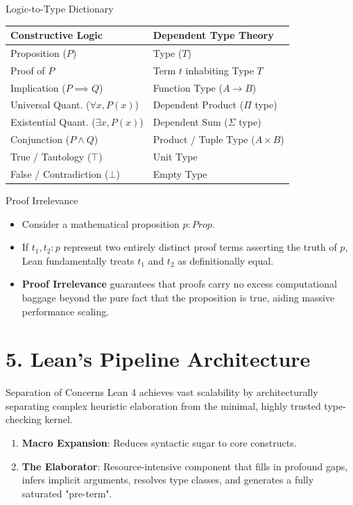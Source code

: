 \documentclass[12pt, aspectratio=169]{beamer}
\begin{document}
\begin{frame}{Logic-to-Type Dictionary}
\begin{table}[]
\begin{tabular}{ll}
\textbf{Constructive Logic}          & \textbf{Dependent Type Theory} \\ \hline
Proposition ($P$)                    & Type ($T$)                     \\
Proof of $P$                         & Term $t$ inhabiting Type $T$   \\
Implication ($P \implies Q$)         & Function Type ($A \to B$)      \\
Universal Quant. ($\forall x, P(x)$) & Dependent Product ($\Pi$ type) \\
Existential Quant. ($\exists x, P(x)$) & Dependent Sum ($\Sigma$ type)  \\
Conjunction ($P \land Q$)            & Product / Tuple Type ($A \times B$) \\
True / Tautology ($\top$)            & Unit Type                      \\
False / Contradiction ($\bot$)       & Empty Type                     \\ \hline
\end{tabular}
\end{table}
\end{frame}

\begin{frame}{Proof Irrelevance}
\begin{itemize}\setlength{\itemsep}{1.2em}
  \item Consider a mathematical proposition $p : Prop$.
  \item If $t_1, t_2 : p$ represent two entirely distinct proof terms asserting the truth of $p$, Lean fundamentally treats $t_1$ and $t_2$ as definitionally equal.
  \item \textbf{Proof Irrelevance} guarantees that proofs carry no excess computational baggage beyond the pure fact that the proposition is true, aiding massive performance scaling.
\end{itemize}
\end{frame}

\section{5. Lean's Pipeline Architecture}

\begin{frame}{Separation of Concerns}
Lean 4 achieves vast scalability by architecturally separating complex heuristic elaboration from the minimal, highly trusted type-checking kernel.
\begin{enumerate}\setlength{\itemsep}{1.0em}
  \item \textbf{Macro Expansion}: Reduces syntactic sugar to core constructs.
  \item \textbf{The Elaborator}: Resource-intensive component that fills in profound gaps, infers implicit arguments, resolves type classes, and generates a fully saturated "pre-term".
\end{enumerate}
\end{frame}
\end{document}
